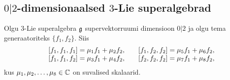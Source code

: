
\subsection{\texorpdfstring{$0|2$}{0|2}-dimensionaalsed
    \texorpdfstring{$3$}{3}-Lie superalgebrad}

Olgu $3$-Lie superalgebra $\mathfrak{g}$ supervektorruumi dimensioon
$0|2$ ja olgu tema generaatoriteks $\{ f_1, f_2 \}$. Siis
\begin{align*}
    \begin{matrix*}[l]
        & [f_1, f_1, f_1] = \m_1 f_1 + \m_2 f_2, \quad
        & [f_1, f_2, f_2] = \m_5 f_1 + \m_6 f_2, \\
        & [f_1, f_1, f_2] = \m_3 f_1 + \m_4 f_2, \quad
        & [f_2, f_2, f_2] = \m_7 f_1 + \m_8 f_2,
    \end{matrix*}
\end{align*}
kus $\mu_1, \mu_2, \dots, \mu_8 \in \mathbb{C}$ on suvalised skalaarid.

